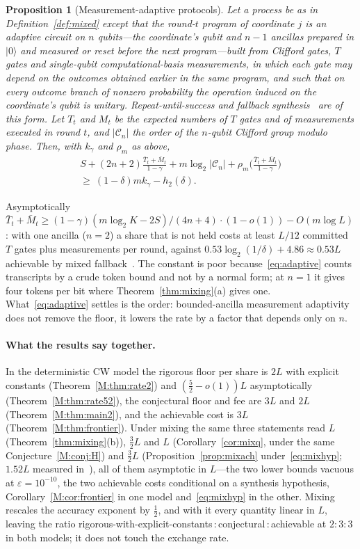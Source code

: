 \documentclass[aps,prx,twocolumn,superscriptaddress,nofootinbib,longbibliography]{revtex4-2}
\theoremstyle{plain}
\newtheorem{proposition}{Proposition}
\theoremstyle{definition}
\theoremstyle{remark}
\begin{document}
\begin{proposition}[Measurement-adaptive protocols]\label{prop:adaptive}
Let a process be as in Definition~\ref{def:mixed} except that the round-$t$ program of coordinate $j$ is an adaptive circuit on $n$ qubits---the coordinate's qubit and $n-1$ ancillas prepared in $|0\rangle$ and measured or reset before the next program---built from Clifford gates, $T$ gates and single-qubit computational-basis measurements, in which each gate may depend on the outcomes obtained earlier in the same program, and such that on every outcome branch of nonzero probability the operation induced on the coordinate's qubit is unitary. Repeat-until-success and fallback synthesis~\cite{BRS,KLMPP} are of this form. Let $T_t$ and $M_t$ be the expected numbers of $T$ gates and of measurements executed in round $t$, and $|\mathcal C_n|$ the order of the $n$-qubit Clifford group modulo phase. Then, with $k_\gamma$ and $\rho_m$ as above,
\begin{multline}\label{eq:adaptive}
S+(2n+2)\frac{\bar T_t+\bar M_t}{1-\gamma}+m\log_2|\mathcal C_n|+\rho_m\Big(\frac{\bar T_t+\bar M_t}{1-\gamma}\Big)\\ \ge\ (1-\delta)mk_\gamma-h_2(\delta).
\end{multline}
\end{proposition}
Asymptotically $\bar T_t+\bar M_t\ge(1-\gamma)(m\log_2K-2S)/(4n+4)\cdot(1-o(1))-O(m\log L)$: with one ancilla ($n=2$) a share that is not held costs at least $L/12$ committed $T$ gates plus measurements per round, against $0.53\log_2(1/\delta)+4.86\approx0.53L$ achievable by mixed fallback~\cite[Eq.~(13)]{KLMPP,Bothe}. The constant is poor because~\eqref{eq:adaptive} counts transcripts by a crude token bound and not by a normal form; at $n=1$ it gives four tokens per bit where Theorem~\ref{thm:mixing}(a) gives one. What~\eqref{eq:adaptive} settles is the order: bounded-ancilla measurement adaptivity does not remove the floor, it lowers the rate by a factor that depends only on $n$.

\paragraph{What the results say together.} In the deterministic CW model the rigorous floor per share is $2L$ with explicit constants (Theorem~\ref{M:thm:rate2}) and $(\tfrac52-o(1))L$ asymptotically (Theorem~\ref{M:thm:rate52}), the conjectural floor and fee are $3L$ and $2L$ (Theorem~\ref{M:thm:main2}), and the achievable cost is $3L$ (Theorem~\ref{M:thm:frontier}). Under mixing the same three statements read $L$ (Theorem~\ref{thm:mixing}(b)), $\tfrac32L$ and $L$ (Corollary~\ref{cor:mixq}, under the same Conjecture~\ref{M:conj:H}) and $\tfrac32L$ (Proposition~\ref{prop:mixach} under~\eqref{eq:mixhyp}; $1.52L$ measured in~\cite{KLMPP}), all of them asymptotic in $L$---the two lower bounds vacuous at $\varepsilon=10^{-10}$, the two achievable costs conditional on a synthesis hypothesis, Corollary~\ref{M:cor:frontier} in one model and~\eqref{eq:mixhyp} in the other. Mixing rescales the accuracy exponent by $\tfrac12$, and with it every quantity linear in $L$, leaving the ratio rigorous-with-explicit-constants\,:\,conjectural\,:\,achievable at $2:3:3$ in both models; it does not touch the exchange rate.
\end{document}
